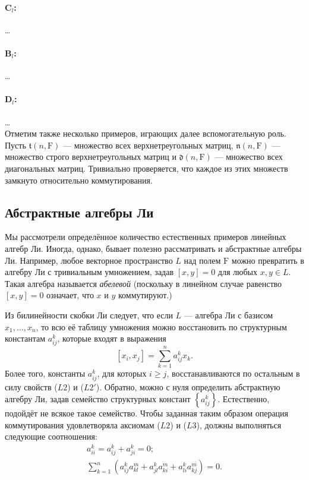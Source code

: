 \documentclass[a4paper, 12pt]{article}
\theoremstyle{definition}
\begin{document}
\paragraph{\( \mathbf{C}_l \):} \ldots
\paragraph{\( \mathbf{B}_l \):} \ldots
\paragraph{\( \mathbf{D}_l \):} \ldots \\

Отметим также несколько примеров, играющих далее вспомогательную роль. Пусть \( \mathfrak{t}(n, \mathrm F) \) --- множество всех верхнетреугольных матриц, \( \mathfrak{n}(n, \mathrm F) \) --- множество строго верхнетреугольных матриц и \( \mathfrak{d}(n, \mathrm F) \) --- множество всех диагональных матриц. Тривиально проверяется, что каждое из этих множеств замкнуто относительно коммутирования.

\subsection{Абстрактные алгебры Ли}
Мы рассмотрели определённое количество естественных примеров линейных алгебр Ли. Иногда, однако, бывает полезно рассматривать и абстрактные алгебры Ли. Например, любое векторное пространство \({ L }\) над полем \({ \mathrm F }\) можно превратить в алгебру Ли с тривиальным умножением, задав \({ [x, y] = 0 }\) для любых \({ x, y \in L }\). Такая алгебра называется \textit{абелевой} (поскольку в линейном случае равенство \({ [x, y] = 0 }\) означает, что \({ x }\) и \({ y }\) коммутируют.)

Из билинейности скобки Ли следует, что если \({ L }\) --- алгебра Ли с базисом \({ x_1, \ldots, x_n }\), то всю её таблицу умножения можно восстановить по структурным константам \({ a^{k}_{ij} }\), которые входят в выражения
\[
    [x_i, x_j] = \sum_{k=1}^{n} a^{k}_{ij} x_k.
\]
Более того, константы \({ a^{k}_{ij} }\), для которых \({ i \geqslant j }\), восстанавливаются по остальным в силу свойств (\({ L 2 }\)) и (\({ L 2' }\)). Обратно, можно с нуля определить абстрактную алгебру Ли, задав семейство структурных констант \({ \left\{ a^{k}_{ij} \right\} }\). Естественно, подойдёт не всякое такое семейство. Чтобы заданная таким образом операция коммутирования удовлетворяла аксиомам (\({ L 2 }\)) и (\({ L 3 }\)), должны выполняться следующие соотношения:
\[
    \begin{gathered}
        a^{k}_{ii} = a^{k}_{ij} + a^{k}_{ji} = 0; \\
        \sum_{k=1}^{n} \left( a^{k}_{ij} a^{m}_{kl} + a^{k}_{jl} a^{m}_{ki} + a^{k}_{li} a^{m}_{kj} \right) = 0.
    \end{gathered}
\]
\end{document}
